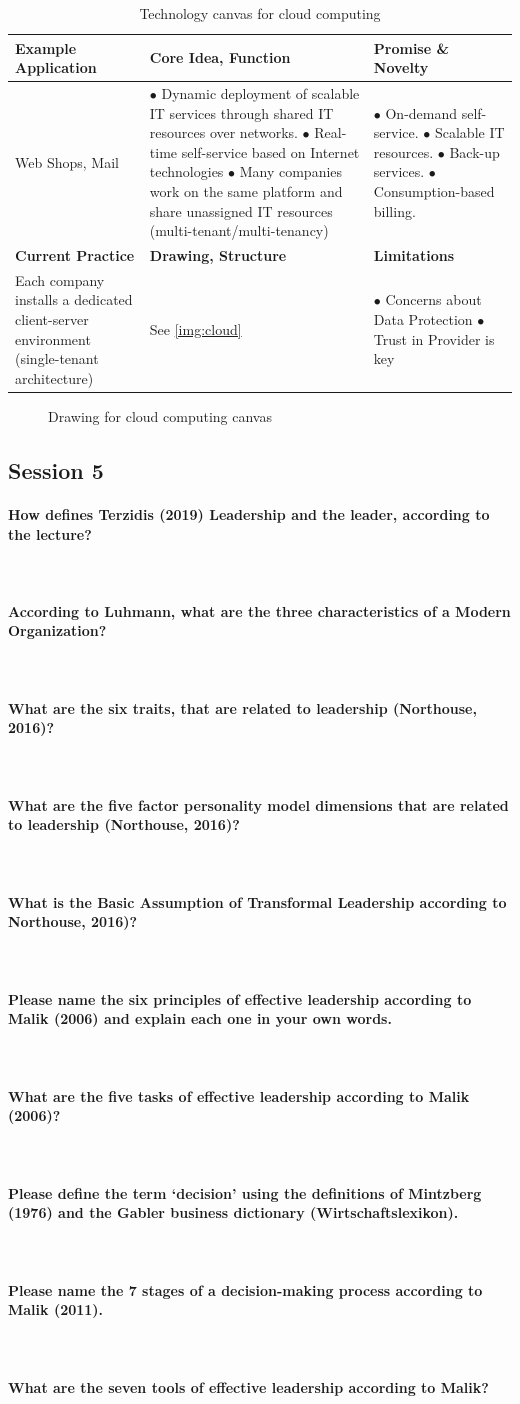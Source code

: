 \documentclass[10pt,a4paper,noendnumber=true]{scrartcl}
\newcommand{\properparagraph}[1]{\paragraph{\textcolor{Emerald}{#1}}\mbox{}\\}
\begin{document}
\begin{table}[tbh!]
		\centering
		\caption{Technology canvas for cloud computing}
		\begin{tabularx}{\textwidth}{XXX}
			\toprule
			\textbf{Example Application} & \textbf{Core Idea, Function} & \textbf{Promise \& Novelty} \\
			\midrule
			Web Shops, Mail & 
		    $\bullet$ Dynamic deployment of scalable IT services through shared IT resources over networks. \newline	
			$\bullet$ Real-time self-service based on Internet technologies \newline			
			$\bullet$ Many companies work on the same platform and share unassigned IT resources (multi-tenant/multi-tenancy)			 
            &   
			$\bullet$ On-demand self-service.\newline			
			$\bullet$ Scalable IT resources.\newline			
			$\bullet$ Back-up services.\newline			
			$\bullet$ Consumption-based billing. 
			\\
			\midrule
			\textbf{Current Practice} & \textbf{Drawing, Structure} & \textbf{Limitations} \\
			\midrule
			Each company installs a dedicated client-server environment (single-tenant architecture) & See \autoref{img:cloud} & $\bullet$ Concerns about Data Protection \newline $\bullet$ Trust in Provider is key\\
			\bottomrule
		\end{tabularx}
\end{table}

\begin{figure}[H]
    \centering
    \def\svgwidth{0.7\textwidth}
    
    \caption{Drawing for cloud computing canvas}
    \label{img:cloud}
\end{figure}


\newpage
\subsection{Session 5}
\properparagraph{How defines Terzidis (2019) Leadership and the leader, according to the lecture?}
\properparagraph{ According to Luhmann, what are the three characteristics of a Modern Organization?}
\properparagraph{What are the six traits, that are related to leadership (Northouse, 2016)?}
\properparagraph{What are the five factor personality model dimensions that are related to leadership (Northouse, 2016)?}
\properparagraph{What is the Basic Assumption of Transformal Leadership according to Northouse, 2016)?}
\properparagraph{Please name the six principles of effective leadership according to Malik (2006) and explain	each one in your own words.}
\properparagraph{What are the five tasks of effective leadership according to Malik (2006)?}
\properparagraph{Please define the term ‘decision’ using the definitions of Mintzberg (1976) and the Gabler business dictionary (Wirtschaftslexikon).}
\properparagraph{Please name the 7 stages of a decision-making process according to Malik (2011).}
\properparagraph{What are the seven tools of effective leadership according to Malik?}
\end{document}
